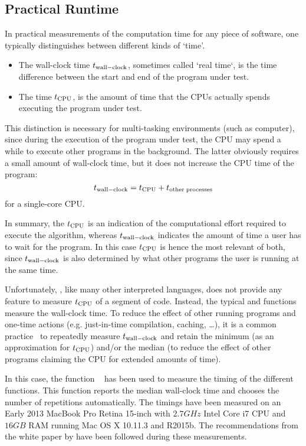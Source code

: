 \subsection{Practical Runtime}
In practical measurements of the computation time for any piece of software, one typically distinguishes between different kinds of `time'.
\begin{itemize}
  \item The wall-clock time $t_{\mathrm{wall-clock}}$, sometimes called `real time`, is the time difference between the start and end of the program under test.
  \item The  time $t_{\mathrm{CPU}}$, is the amount of time that the \glspl{CPU} actually spends executing the program under test.
\end{itemize}
This distinction is necessary for multi-tasking environments (such as computer), since during the execution of the program under test, the \gls{CPU} may spend a while to execute other programs in the background.
The latter obviously requires a small amount of wall-clock time, but it does not increase the \gls{CPU} time of the program:
\begin{equation}
  t_{\mathrm{wall-clock}} = t_{\mathrm{CPU}} + t_{\mathrm{other\;processes}}
\end{equation}
for a single-core \gls{CPU}.

In summary, the $t_{\mathrm{CPU}}$ is an indication of the computational effort required to execute the algorithm, whereas $t_{\mathrm{wall-clock}}$ indicates the amount of time a user has to wait for the program.
In this case $t_{\mathrm{CPU}}$ is hence the most relevant of both, since $t_{\mathrm{wall-clock}}$ is also determined by what other programs the user is running at the same time.

Unfortunately, \MATLAB, like many other interpreted languages, does not provide any feature to measure $t_{\mathrm{CPU}}$ of a segment of code.
Instead, the typical  and  functions measure the wall-clock time.
To reduce the effect of other running programs and one-time actions (e.g. just-in-time compilation, caching, \ldots), it is a common practice~\citep{McKeeman2008} to repeatedly measure $t_{\mathrm{wall-clock}}$ and retain the minimum (as an approximation for $t_{\mathrm{CPU}}$) and/or the median (to reduce the effect of other programs claiming the \gls{CPU} for extended amounts of time).

In this case, the \MATLAB function ~\citep{matlab:timeit} has been used to measure the timing of the different functions.
This function  reports the median wall-clock time and chooses the number of repetitions automatically.
The timings have been measured on an Early 2013 MacBook Pro Retina 15-inch with $2.7\unit{GHz}$ Intel Core i7 \gls{CPU} and $16 \unit{GB}$ \gls{RAM} running Mac OS X 10.11.3 and \MATLAB R2015b.
The recommendations from the white paper by \citet{McKeeman2008} have been followed during these measurements.

